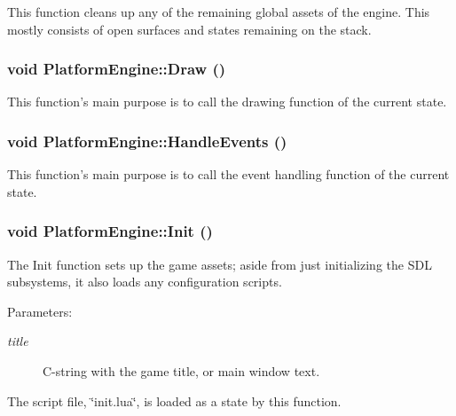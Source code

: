 This function cleans up any of the remaining global assets of the engine. This mostly consists of open surfaces and states remaining on the stack. \hypertarget{class_platform_engine_cd756d58f81c5e28efe98ae075367a5c}{
\subsubsection[{Draw}]{\setlength{\rightskip}{0pt plus 5cm}void PlatformEngine::Draw ()}}
\label{db/da1/class_platform_engine_cd756d58f81c5e28efe98ae075367a5c}


This function's main purpose is to call the drawing function of the current state. \hypertarget{class_platform_engine_7fc47bff353292f1a1435d78664df36d}{
\subsubsection[{HandleEvents}]{\setlength{\rightskip}{0pt plus 5cm}void PlatformEngine::HandleEvents ()}}
\label{db/da1/class_platform_engine_7fc47bff353292f1a1435d78664df36d}


This function's main purpose is to call the event handling function of the current state. \hypertarget{class_platform_engine_059814bb3f1815b15d5a892f8ea6cb4a}{
\subsubsection[{Init}]{\setlength{\rightskip}{0pt plus 5cm}void PlatformEngine::Init ()}}
\label{db/da1/class_platform_engine_059814bb3f1815b15d5a892f8ea6cb4a}


The Init function sets up the game assets; aside from just initializing the SDL subsystems, it also loads any configuration scripts.

\begin{Desc}
\item[Parameters:]
\begin{description}
\item[{\em title}]C-string with the game title, or main window text. \end{description}
\end{Desc}


The script file, \char`\"{}init.lua\char`\"{}, is loaded as a state by this function.

